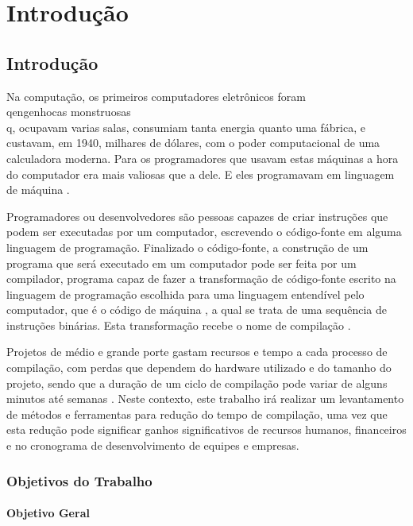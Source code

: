 \part{Introdução}

\chapter*[Introdução]{Introdução}

Na computação, os primeiros computadores eletrônicos foram \\qengenhocas
 monstruosas\\q, ocupavam varias salas, consumiam tanta energia quanto
 uma fábrica, e custavam, em 1940, milhares de dólares, com o poder
 computacional de uma calculadora moderna. Para os
 programadores que usavam estas máquinas a hora do computador era
 mais valiosas que a dele. E eles programavam em linguagem de
 máquina \cite[pág.5]{ref6}.

Programadores ou desenvolvedores são pessoas capazes de criar instruções
 que podem ser executadas por um computador, escrevendo o código-fonte em
 alguma linguagem de programação. Finalizado o código-fonte, a construção
 de um programa que será executado em um computador pode ser feita por um
 compilador, programa capaz de fazer a transformação de
 código-fonte escrito na linguagem de programação escolhida para uma linguagem
 entendível pelo computador, que é o código de máquina \cite[pág.5]{ref6}, a qual
 se trata de uma sequência de instruções binárias.
 Esta transformação recebe o nome de compilação \cite[pág.1]{ref5}.

Projetos de médio e grande porte gastam recursos e tempo a cada processo
 de compilação, com perdas que dependem do hardware utilizado e do tamanho
 do projeto, sendo que a duração de um ciclo de compilação pode variar de
 alguns minutos até semanas \cite[pág.5]{ref6}. Neste contexto, este trabalho
 irá realizar um levantamento de métodos e ferramentas para redução do
 tempo de compilação, uma vez que esta redução pode significar ganhos
 significativos de recursos humanos, financeiros e no cronograma de
 desenvolvimento de equipes e empresas. 

\section*{Objetivos do Trabalho}

\subsection*{Objetivo Geral}

